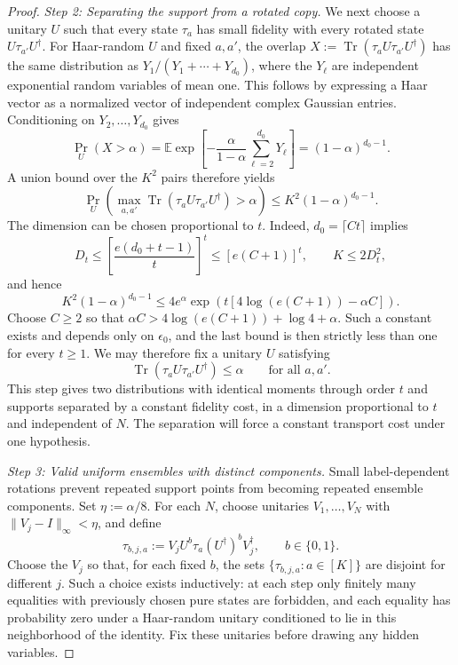 \documentclass[aps,prx,reprint,superscriptaddress,amsmath,amssymb,longbibliography,floatfix]{revtex4-2}
\theoremstyle{plain}
\theoremstyle{definition}
\theoremstyle{remark}
\begin{document}
\begin{proof}
\emph{Step 2: Separating the support from a rotated copy.} We next choose a unitary $U$ such that every state $\tau_a$ has small fidelity with every rotated state $U\tau_{a'}U^\dagger$. For Haar-random $U$ and fixed $a,a'$, the overlap $X:=\operatorname{Tr}(\tau_aU\tau_{a'}U^\dagger)$ has the same distribution as $Y_1/(Y_1+\cdots+Y_{d_0})$, where the $Y_\ell$ are independent exponential random variables of mean one. This follows by expressing a Haar vector as a normalized vector of independent complex Gaussian entries. Conditioning on $Y_2,\ldots,Y_{d_0}$ gives
\[
\Pr_U(X>\alpha)=\mathbb E\exp\!\left[-\frac{\alpha}{1-\alpha}\sum_{\ell=2}^{d_0}Y_\ell\right]=(1-\alpha)^{d_0-1}.
\]
A union bound over the $K^2$ pairs therefore yields
\[
\Pr_U\!\left(\max_{a,a'}\operatorname{Tr}(\tau_aU\tau_{a'}U^\dagger)>\alpha\right)\le K^2(1-\alpha)^{d_0-1}.
\]
The dimension can be chosen proportional to $t$. Indeed, $d_0=\lceil Ct\rceil$ implies
\[
D_t\le\left[\frac{e(d_0+t-1)}{t}\right]^t\le[e(C+1)]^t,\qquad K\le2D_t^2,
\]
and hence
\[
K^2(1-\alpha)^{d_0-1}\le4e^\alpha\exp\!\left(t\left[4\log(e(C+1))-\alpha C\right]\right).
\]
Choose $C\ge2$ so that $\alpha C>4\log(e(C+1))+\log4+\alpha$. Such a constant exists and depends only on $\epsilon_0$, and the last bound is then strictly less than one for every $t\ge1$. We may therefore fix a unitary $U$ satisfying
\begin{equation}
\operatorname{Tr}(\tau_aU\tau_{a'}U^\dagger)\le\alpha\qquad\text{for all }a,a'.
\label{eq:app-wasserstein-separated-supports}
\end{equation}
This step gives two distributions with identical moments through order $t$ and supports separated by a constant fidelity cost, in a dimension proportional to $t$ and independent of $N$. The separation will force a constant transport cost under one hypothesis.

\emph{Step 3: Valid uniform ensembles with distinct components.} Small label-dependent rotations prevent repeated support points from becoming repeated ensemble components. Set $\eta:=\alpha/8$. For each $N$, choose unitaries $V_1,\ldots,V_N$ with $\|V_j-I\|_\infty<\eta$, and define
\[
\tau_{b,j,a}:=V_jU^b\tau_a(U^\dagger)^bV_j^\dagger,\qquad b\in\{0,1\}.
\]
Choose the $V_j$ so that, for each fixed $b$, the sets $\{\tau_{b,j,a}:a\in[K]\}$ are disjoint for different $j$. Such a choice exists inductively: at each step only finitely many equalities with previously chosen pure states are forbidden, and each equality has probability zero under a Haar-random unitary conditioned to lie in this neighborhood of the identity. Fix these unitaries before drawing any hidden variables.


\end{proof}
\end{document}
